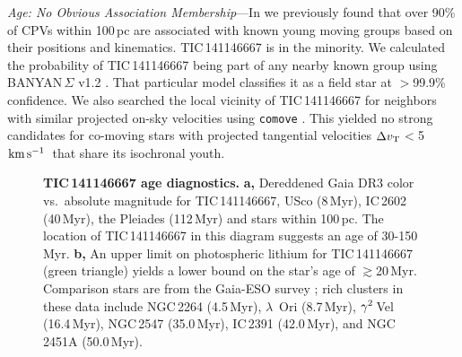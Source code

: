 \documentclass[11pt,twocolumn,tighten,linenumbers]{aastex7}
\newcommand{\kms}{\ensuremath{\rm km\,s^{-1}}}
\begin{document}
{\it Age: No Obvious Association Membership}---In \citet{Bouma2024} we
previously found that over 90\% of CPVs within 100\,pc are associated
with known young moving groups based on their positions and
kinematics.  TIC\,141146667 is in the minority.  We calculated the
probability of TIC\,141146667 being part of any nearby known group
using BANYAN\,$\Sigma$ v1.2 \citep{Gagne2018}.  That particular model
classifies it as a field star at $>$99.9\% confidence.  We also
searched the local vicinity of TIC\,141146667 for neighbors with
similar projected on-sky velocities using \texttt{comove}
\citep{Tofflemire2021}.  This yielded no strong candidates for
co-moving stars with projected tangential velocities $\Delta v_{\rm
T}$$<$5\,\kms\ that share its isochronal youth.

\begin{figure}[!t]
	\begin{center}
	\end{center}
	\vspace{-0.3cm}
  \caption{{\bf TIC\,141146667 age diagnostics.}
  {\bf a,} Dereddened Gaia DR3 color vs.~absolute magnitude for
  TIC\,141146667, USco (8\,Myr), IC\,2602 (40\,Myr), the Pleiades
  (112\,Myr) and stars within 100\,pc. 
  The location of TIC\,141146667 in this diagram suggests an age of
  30-150\,Myr. 
  {\bf b,} An upper limit on photospheric lithium for TIC\,141146667
  (green triangle) yields a lower bound on the star's age of
  $\gtrsim$20\,Myr.  Comparison stars are from the Gaia-ESO survey
  \citep{Jeffries2023}; rich clusters in these data include NGC\,2264
  (4.5\,Myr), $\lambda$~Ori (8.7\,Myr), ${\rm \gamma}^2$\,Vel
  (16.4\,Myr), NGC\,2547 (35.0\,Myr), IC\,2391 (42.0\,Myr),
  and NGC\,2451A (50.0\,Myr).}
  \label{fig:age_diagnostics}
\end{figure}
\end{document}
